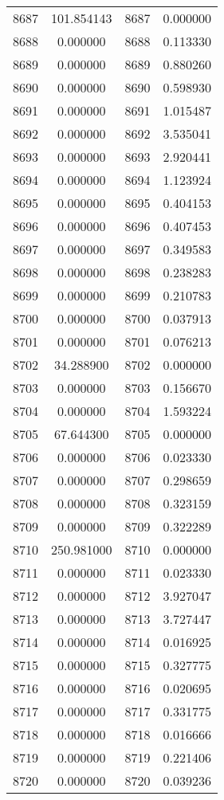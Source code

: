 \documentclass[12pt]{article}
\begin{document}
\begin{longtable}{@{}cccc@{}}
8687 & 101.854143 & 8687 & 0.000000 \\
8688 & 0.000000 & 8688 & 0.113330 \\
8689 & 0.000000 & 8689 & 0.880260 \\
8690 & 0.000000 & 8690 & 0.598930 \\
8691 & 0.000000 & 8691 & 1.015487 \\
8692 & 0.000000 & 8692 & 3.535041 \\
8693 & 0.000000 & 8693 & 2.920441 \\
8694 & 0.000000 & 8694 & 1.123924 \\
8695 & 0.000000 & 8695 & 0.404153 \\
8696 & 0.000000 & 8696 & 0.407453 \\
8697 & 0.000000 & 8697 & 0.349583 \\
8698 & 0.000000 & 8698 & 0.238283 \\
8699 & 0.000000 & 8699 & 0.210783 \\
8700 & 0.000000 & 8700 & 0.037913 \\
8701 & 0.000000 & 8701 & 0.076213 \\
8702 & 34.288900 & 8702 & 0.000000 \\
8703 & 0.000000 & 8703 & 0.156670 \\
8704 & 0.000000 & 8704 & 1.593224 \\
8705 & 67.644300 & 8705 & 0.000000 \\
8706 & 0.000000 & 8706 & 0.023330 \\
8707 & 0.000000 & 8707 & 0.298659 \\
8708 & 0.000000 & 8708 & 0.323159 \\
8709 & 0.000000 & 8709 & 0.322289 \\
8710 & 250.981000 & 8710 & 0.000000 \\
8711 & 0.000000 & 8711 & 0.023330 \\
8712 & 0.000000 & 8712 & 3.927047 \\
8713 & 0.000000 & 8713 & 3.727447 \\
8714 & 0.000000 & 8714 & 0.016925 \\
8715 & 0.000000 & 8715 & 0.327775 \\
8716 & 0.000000 & 8716 & 0.020695 \\
8717 & 0.000000 & 8717 & 0.331775 \\
8718 & 0.000000 & 8718 & 0.016666 \\
8719 & 0.000000 & 8719 & 0.221406 \\
8720 & 0.000000 & 8720 & 0.039236 \\

\end{longtable}
\end{document}
